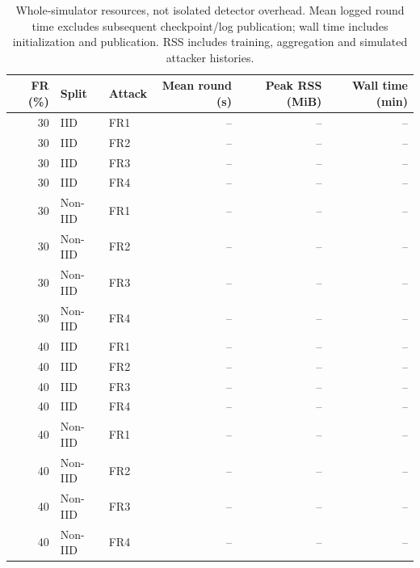 \begin{table}[t]
\centering\footnotesize\setlength{\tabcolsep}{4pt}
\caption{Whole-simulator resources, not isolated detector overhead. Mean logged round time excludes subsequent checkpoint/log publication; wall time includes initialization and publication. RSS includes training, aggregation and simulated attacker histories.}\label{tab:resources}
\begin{tabular}{rllrrr}
\toprule
FR (\%) & Split & Attack & Mean round (s) & Peak RSS (MiB) & Wall time (min) \\
\midrule
30 & IID & FR1 & -- & -- & -- \\
30 & IID & FR2 & -- & -- & -- \\
30 & IID & FR3 & -- & -- & -- \\
30 & IID & FR4 & -- & -- & -- \\
30 & Non-IID & FR1 & -- & -- & -- \\
30 & Non-IID & FR2 & -- & -- & -- \\
30 & Non-IID & FR3 & -- & -- & -- \\
30 & Non-IID & FR4 & -- & -- & -- \\
40 & IID & FR1 & -- & -- & -- \\
40 & IID & FR2 & -- & -- & -- \\
40 & IID & FR3 & -- & -- & -- \\
40 & IID & FR4 & -- & -- & -- \\
40 & Non-IID & FR1 & -- & -- & -- \\
40 & Non-IID & FR2 & -- & -- & -- \\
40 & Non-IID & FR3 & -- & -- & -- \\
40 & Non-IID & FR4 & -- & -- & -- \\
\bottomrule
\end{tabular}
\end{table}

